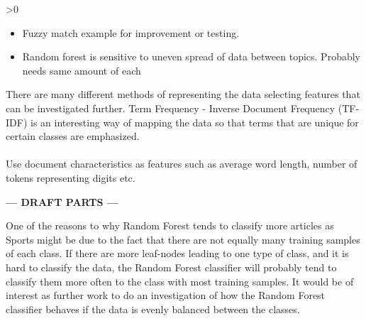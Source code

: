 \ifnum\printdraft>0
	\begin{itemize}
		\item Fuzzy match example for improvement or testing.
		\item Random forest is sensitive to uneven spread of data between topics. Probably needs same amount of each
	\end{itemize}
	There are many different methods of representing the data selecting features that can be investigated further. Term Frequency - Inverse Document Frequency (TF-IDF) is an interesting way of mapping the data so that terms that are unique for certain classes are emphasized.\\\\
	Use document characteristics as features such as average word length, number of tokens representing digits etc.
\else
\begin{center}
	\textbf{--- DRAFT PARTS ---}
\end{center}
\fi
One of the reasons to why Random Forest tends to classify more articles as Sports might be due to the fact that there are not equally many training samples of each class. If there are more leaf-nodes leading to one type of class, and it is hard to classify the data, the Random Forest classifier will probably tend to classify them more often to the class with most training samples. It would be of interest as further work to do an investigation of how the Random Forest classifier behaves if the data is evenly balanced between the classes.